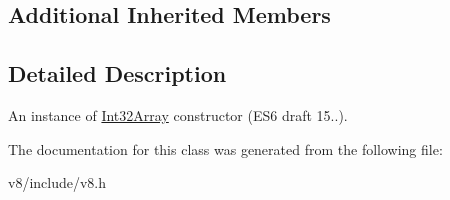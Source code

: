 \subsection*{Additional Inherited Members}


\subsection{Detailed Description}
An instance of \mbox{\hyperlink{classv8_1_1Int32Array}{Int32\+Array}} constructor (E\+S6 draft 15..). 

The documentation for this class was generated from the following file\+:\begin{DoxyCompactItemize}
\item 
v8/include/v8.\+h\end{DoxyCompactItemize}
